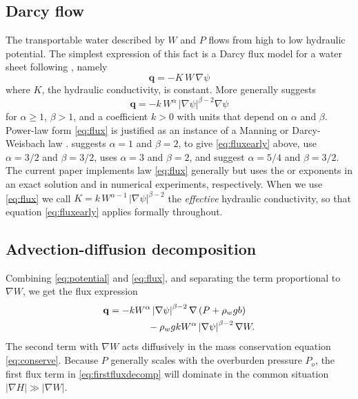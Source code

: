 \documentclass[gmd]{copernicus}   %
\newcommand\bq{\mathbf{q}}
\newcommand{\grad}{\nabla}
\begin{document}
\subsection{Darcy flow}  The transportable water described by $W$ and $P$ flows from high to low hydraulic potential.  The simplest expression of this fact is a Darcy flux model for a water sheet following \cite{Clarke05}, namely
\begin{equation}  \label{eq:fluxearly}
\bq = - K \,W\, \grad \psi
\end{equation}
where $K$, the hydraulic conductivity, is constant.  More generally \cite{Schoofetal2012} suggests
\begin{equation}  \label{eq:flux}
\bq = - k\, W^\alpha\, |\grad \psi|^{\beta-2} \grad \psi
\end{equation}
for $\alpha \ge 1$, $\beta>1$, and a coefficient $k>0$ with units that depend on $\alpha$ and $\beta$.  Power-law form \eqref{eq:flux} is justified as an instance of a Manning or Darcy-Weisbach law \citep{Schoofetal2012}.  \cite{Clarke05} suggests $\alpha=1$ and $\beta=2$, to give \eqref{eq:fluxearly} above, \cite{CreytsSchoof2009} use $\alpha=3/2$ and $\beta=3/2$, \cite{Hewitt2011,Hewitt2013} uses $\alpha=3$ and $\beta = 2$, and \cite{Hewittetal2012} suggest $\alpha=5/4$ and $\beta=3/2$.  The current paper implements law \eqref{eq:flux} generally but uses the \cite{Clarke05} or \cite{Hewittetal2012} exponents in an exact solution and in numerical experiments, respectively.  When we use \eqref{eq:flux} we call $K = k\, W^{\alpha-1}\, |\grad \psi|^{\beta-2}$ the \emph{effective} hydraulic conductivity, so that equation \eqref{eq:fluxearly} applies formally throughout.

\subsection{Advection-diffusion decomposition}  Combining \eqref{eq:potential} and \eqref{eq:flux}, and separating the term proportional to $\grad W$, we get the flux expression
\begin{align}
\bq &= - k  W^\alpha \left|\grad \psi\right|^{\beta-2} \grad \left(P + \rho_w g b\right)  \label{eq:firstfluxdecomp} \\
    &\qquad\qquad - \rho_w g k W^\alpha \left|\grad \psi\right|^{\beta-2} \grad W.  \notag
\end{align}
The second term with $\grad W$ acts diffusively in the mass conservation equation \eqref{eq:conserve}.  Because $P$ generally scales with the overburden pressure $P_o$, the first flux term in \eqref{eq:firstfluxdecomp} will dominate in the common situation $|\grad H| \gg |\grad W|$.
\end{document}
